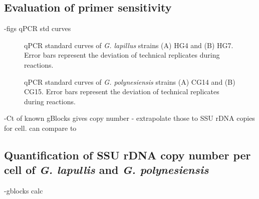 \documentclass[12pt]{article}
\begin{document}
\subsection{Evaluation of primer sensitivity}
-figs qPCR std curves
\FloatBarrier
\begin{figure}
\caption{qPCR standard curves of \emph{G. lapillus} strains (A) HG4 and (B) HG7. Error bars represent the deviation of technical replicates during reactions.}
\label{fig:lapiStd}
\end{figure}
\FloatBarrier
\FloatBarrier
\begin{figure}
\caption{qPCR standard curves of \emph{G. polynesiensis} strains (A) CG14 and (B) CG15. Error bars represent the deviation of technical replicates during reactions.}
\label{fig:polyStd}
\end{figure}
\FloatBarrier
-Ct of known gBlocks gives copy number - extrapolate those to SSU rDNA copies for cell. can compare to
\subsection{Quantification of SSU rDNA copy number per cell of \emph{G. lapullis} and \emph{G. polynesiensis}}
-gblocks calc
\end{document}

